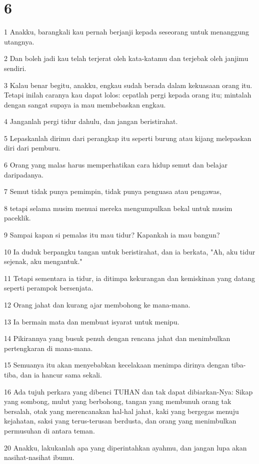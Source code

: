 \chapter{6}

\par 1 Anakku, barangkali kau pernah berjanji kepada seseorang untuk menanggung utangnya.
\par 2 Dan boleh jadi kau telah terjerat oleh kata-katamu dan terjebak oleh janjimu sendiri.
\par 3 Kalau benar begitu, anakku, engkau sudah berada dalam kekuasaan orang itu. Tetapi inilah caranya kau dapat lolos: cepatlah pergi kepada orang itu; mintalah dengan sangat supaya ia mau membebaskan engkau.
\par 4 Janganlah pergi tidur dahulu, dan jangan beristirahat.
\par 5 Lepaskanlah dirimu dari perangkap itu seperti burung atau kijang melepaskan diri dari pemburu.
\par 6 Orang yang malas harus memperhatikan cara hidup semut dan belajar daripadanya.
\par 7 Semut tidak punya pemimpin, tidak punya penguasa atau pengawas,
\par 8 tetapi selama musim menuai mereka mengumpulkan bekal untuk musim paceklik.
\par 9 Sampai kapan si pemalas itu mau tidur? Kapankah ia mau bangun?
\par 10 Ia duduk berpangku tangan untuk beristirahat, dan ia berkata, "Ah, aku tidur sejenak, aku mengantuk."
\par 11 Tetapi sementara ia tidur, ia ditimpa kekurangan dan kemiskinan yang datang seperti perampok bersenjata.
\par 12 Orang jahat dan kurang ajar membohong ke mana-mana.
\par 13 Ia bermain mata dan membuat isyarat untuk menipu.
\par 14 Pikirannya yang busuk penuh dengan rencana jahat dan menimbulkan pertengkaran di mana-mana.
\par 15 Semuanya itu akan menyebabkan kecelakaan menimpa dirinya dengan tiba-tiba, dan ia hancur sama sekali.
\par 16 Ada tujuh perkara yang dibenci TUHAN dan tak dapat dibiarkan-Nya: Sikap yang sombong, mulut yang berbohong, tangan yang membunuh orang tak bersalah, otak yang merencanakan hal-hal jahat, kaki yang bergegas menuju kejahatan, saksi yang terus-terusan berdusta, dan orang yang menimbulkan permusuhan di antara teman.
\par 20 Anakku, lakukanlah apa yang diperintahkan ayahmu, dan jangan lupa akan nasihat-nasihat ibumu.
